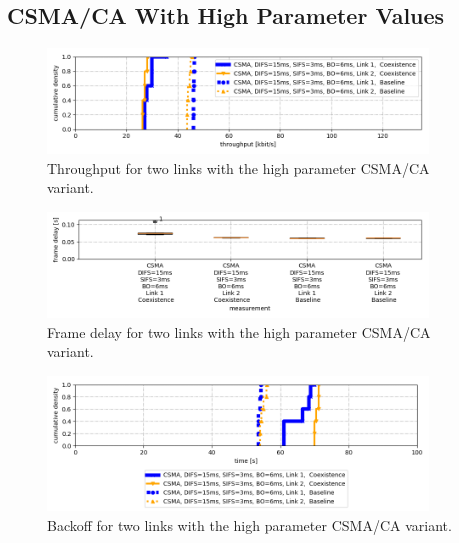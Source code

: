 \clearpage

\subsection{CSMA/CA With High Parameter Values}

\begin{figure}[tb]
	\label{fig:results-csma-high-dbl-throughput}
	\begin{center}
		\includegraphics[width=0.9\textwidth]{pictures/results/same_combinations/csma_high_params/throughput_cdf}
	\end{center}
	\caption{Throughput for two links with the high parameter CSMA/CA variant.}
\end{figure}

\begin{figure}[tb]
	\label{fig:results-csma-high-dbl-frame-delay}
	\begin{center}
		\includegraphics[width=0.9\textwidth]{pictures/results/same_combinations/csma_high_params/frame_delay_boxplot}
	\end{center}
	\caption{Frame delay for two links with the high parameter CSMA/CA variant.}
\end{figure}

\begin{figure}[tb]
	\label{fig:results-csma-high-dbl-backoff}
	\begin{center}
		\includegraphics[width=0.9\textwidth]{pictures/results/same_combinations/csma_high_params/backoff_(joint)_sum_cdf}
	\end{center}
	\caption{Backoff for two links with the high parameter CSMA/CA variant.}
\end{figure}

